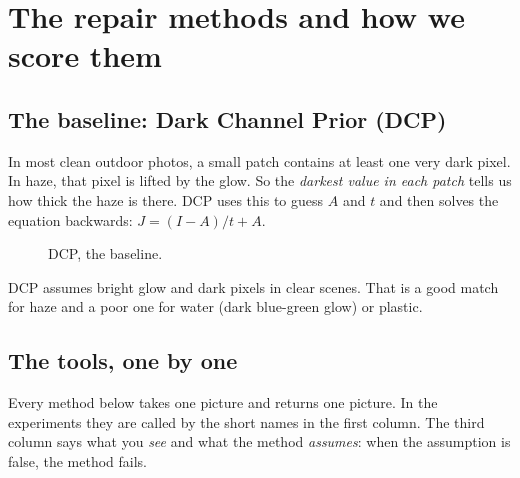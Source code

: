 \documentclass[10pt,a4paper]{article}
\newcommand{\tablein}[1]{}
\begin{document}
\begin{table}[H]\centering\resizebox{\textwidth}{!}{\scriptsize\tablein{data_matrix}}\caption{Which pictures exist and which are actually scored. ``Main comparison'' is the first method-by-method comparison (Section~\ref{sec:synthetic} and~\ref{sec:real}); the last column lists the largest other uses.}\end{table}

\section{The repair methods and how we score them}\label{sec:methods}
\subsection{The baseline: Dark Channel Prior (DCP)}
In most clean outdoor photos, a small patch contains at least one very dark pixel. In haze, that pixel is lifted by the glow. So the \emph{darkest value in each patch} tells us how thick the haze is there. DCP uses this to guess $A$ and $t$ and then solves the equation backwards: $J=(I-A)/t+A$.

\begin{figure}[H]\centering{}\caption{DCP, the baseline.}\end{figure}
DCP assumes bright glow and dark pixels in clear scenes. That is a good match for haze and a poor one for water (dark blue-green glow) or plastic.

\subsection{The tools, one by one}
\label{sec:tools}
Every method below takes one picture and returns one picture. In the experiments they are called by the short names in the first column. The third column says what you \emph{see} and what the method \emph{assumes}: when the assumption is false, the method fails.
\end{document}
